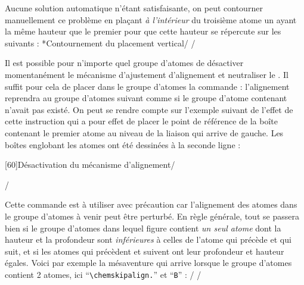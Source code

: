 \documentclass[10pt]{article}
\makeatletter
\newcommand\idx{\@ifstar{\let\print@or@not\@gobble\idx@}{\let\print@or@not\@firstofone\idx@}}
\newcommand\idx@[1]{%
	\ifcat\expandafter\noexpand\@car#1\@nil\relax%
		\expandafter\ifx\@car#1\@nil\protect
			\index{#1}%
			\print@or@not{#1}%
		\else
			\saveexpandmode\expandarg
			\StrSubstitute{\string#1}{\string @}{\@empty\protect\symbol{'100}}[\temp@]%
			\StrGobbleLeft\temp@1[\temp@]%
			\restoreexpandmode
			\expandafter\index\expandafter{\temp@ @\protect\texttt{\protect\textbackslash\temp@}}%
			\print@or@not{\texttt{\string#1}}%
		\fi
	\else
		\index{#1}%
		\print@or@not{#1}%
	\fi
}
\newcommand\make@car@active[1]{%
	\catcode`#1\active
	\begingroup
		\lccode`\~`#1\relax
		\lowercase{\endgroup\def~}%
}
\newif\if@exstar
\newcommand\exemple{%
	\begingroup
	\parskip\z@
	\@makeother\;\@makeother\!\@makeother\?\@makeother\:%
	\@ifstar{\@exstartrue\exemple@}{\@exstarfalse\exemple@}}
\newcommand\exemple@[2][65]{%
	\medbreak\noindent
	\begingroup
		\let\do\@makeother\dospecials
		\make@car@active\ { {}}%
		\make@car@active\^^M{\par\leavevmode}%
		\make@car@active\,{\leavevmode\kern\z@\string,}%
		\make@car@active\-{\leavevmode\kern\z@\string-}%
		\make@car@active\>{\leavevmode\kern\z@\string>}%
		\make@car@active\<{\leavevmode\kern\z@\string<}%
		\exemple@@{#1}{#2}%
}
\newcommand\exemple@@[3]{%
	\def\@tempa##1#3{\exemple@@@{#1}{#2}{##1}}%
	\@tempa
}
\newcommand\exemple@@@[3]{%
	\xdef\the@code{#3}%
	\endgroup
	\if@exstar
		\begingroup
			\fboxrule0.4pt
			\let\breakboxparindent\z@
			\def\bkvz@bottom{\hrule\@height\fboxrule}%
			\let\bkvz@before@breakbox\relax
			\def\bkvz@set@linewidth{\advance\linewidth\dimexpr-2\fboxrule-2\fboxsep}%
			\def\bkvz@left{\vrule\@width\fboxrule\hskip\fboxsep}%
			\def\bkvz@right{\hskip\fboxsep\vrule\@width\fboxrule}%
			\def\bkvz@top{\hbox to \hsize{%
				\vrule\@width\fboxrule\@height\fboxrule
				\leaders\bkvz@bottom\hfill
				\ECFAugie
				\fboxsep\z@
				\colorbox{black}{\kern0.25em\color{white}\footnotesize\lower0.5ex\hbox{\strut#2}\kern0.25em}%
				\leaders\bkvz@bottom\hfill
				\vrule\@width\fboxrule\@height\fboxrule}}%
			\breakbox
				\kern.5ex\relax
				\ttfamily\footnotesize\the@code\par
				\normalfont
				\kern3pt
				\hrule height0.1pt width\linewidth depth0.1pt
				\vskip5pt
				\rightskip0pt plus 1fill
				\everypar{{\color{lightgray}\rlap{\vrule height0.1pt width\linewidth depth0.1pt}}\hskip0pt plus 1fill}%
				\newlinechar`\^^M\everyeof{\noexpand}\scantokens{#3}\par
			\endbreakbox
		\endgroup
	\else
		\vskip0.5ex
		\boxput*(0,1)
			{\fboxsep\z@
			\hbox{\ECFAugie\colorbox{black}{\leavevmode\kern0.25em{\color{white}\footnotesize\strut#2}\kern0.25em}}%
			}%
			{\fboxsep5pt
			\fbox{%
				$\vcenter{\hsize\dimexpr0.#1\linewidth-\fboxsep-\fboxrule\relax
					\kern5pt\parskip0pt \ttfamily\footnotesize\the@code}%
				\vcenter{\kern5pt\hsize\dimexpr\linewidth-0.#1\linewidth-\fboxsep-\fboxrule\relax
					\everypar{{\color{lightgray}\rlap{\vrule height0.1pt width\dimexpr\linewidth-0.#1\linewidth-\fboxsep-\fboxrule depth0.1pt}}}%
					\footnotesize\newlinechar`\^^M\everyeof{\noexpand}\scantokens{#3}}$%
				}%
			}%
	\fi
	\medbreak
	\endgroup
}
\let\do\@makeother\dospecials
\makeatother
\begin{document}
Aucune solution automatique n'étant satisfaisante, on peut contourner manuellement ce problème en plaçant \emph{à l'intérieur} du troisième atome un \idx{\vphantom} ayant la même hauteur que le premier pour que cette hauteur se répercute sur les suivants :
\exemple*{Contournement du placement vertical}/\Huge\setatomsep{2em}
\qquad
{}/

\label{chemskipalign}Il est possible pour n'importe quel groupe d'atomes de désactiver momentanément le mécanisme d'ajustement d'alignement et neutraliser le \idx\vphantom. Il suffit pour cela de placer dans le groupe d'atomes la commande \idx{\chemskipalign} : l'alignement reprendra au groupe d'atomes suivant comme si le groupe d'atome contenant \idx{\chemskipalign} n'avait pas existé. On peut se rendre compte sur l'exemple suivant de l'effet de cette instruction qui a pour effet de placer le point de référence de la boîte contenant le premier atome au niveau de la liaison qui arrive de gauche. Les boîtes englobant les atomes ont été dessinées à la seconde ligne :

\exemple[60]{Désactivation du mécanisme d'alignement}/\large
{}\quad
{}\par\bigskip
\fboxsep=0pt
\renewcommand\printatom[1]{\fbox{\ensuremath{\mathrm{#1}}}}
\quad
{}/

Cette commande est à utiliser avec précaution car l'alignement des atomes dans le groupe d'atomes à venir peut être perturbé. En règle générale, tout se passera bien si le groupe d'atomes dans lequel figure \idx{\chemskipalign} contient \emph{un seul atome} dont la hauteur et la profondeur sont \emph{inférieures} à celles de l'atome qui précède et qui suit, et si les atomes qui précèdent et suivent ont leur profondeur et hauteur égales. Voici par exemple la mésaventure qui arrive lorsque le groupe d'atomes contient 2 atomes, ici ``\verb-\chemskipalign.-'' et ``\verb-B-'' :
\exemple{Conséquence de la commande \string\chemskipalign}/\large
\fboxsep=0pt
\renewcommand\printatom[1]{\fbox{\ensuremath{\mathrm{#1}}}}
/
\end{document}
